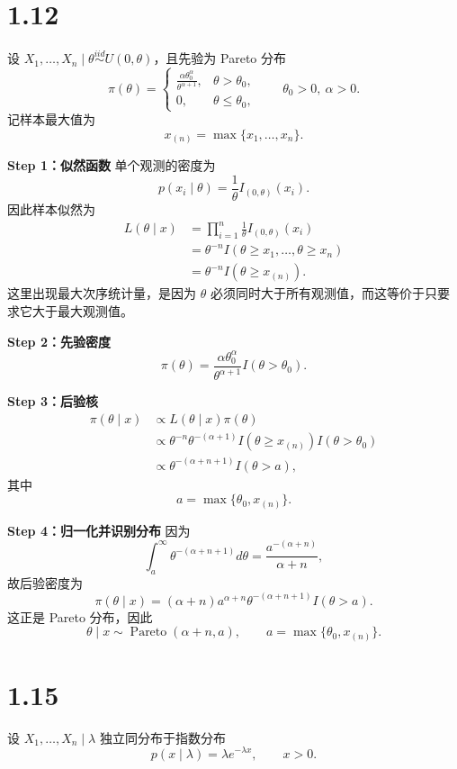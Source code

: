 \documentclass[UTF8,zihao=-4]{ctexart}
\begin{document}
\section*{1.12}
设 \(X_1,\ldots,X_n\mid\theta\overset{iid}{\sim}U(0,\theta)\)，且先验为 Pareto 分布
\[
\pi(\theta)=
\begin{cases}
\displaystyle\frac{\alpha\theta_0^\alpha}{\theta^{\alpha+1}},&\theta>\theta_0,\\
0,&\theta\leq\theta_0,
\end{cases}
\qquad\theta_0>0,\ \alpha>0.
\]
记样本最大值为
\[
x_{(n)}=\max\{x_1,\ldots,x_n\}.
\]

\textbf{Step 1：似然函数}
单个观测的密度为
\[
p(x_i\mid\theta)=\frac1\theta I_{(0,\theta)}(x_i).
\]
因此样本似然为
\[
\begin{aligned}
L(\theta\mid x)&=\prod_{i=1}^n\frac1\theta I_{(0,\theta)}(x_i)\\
&=\theta^{-n}I(\theta\geq x_1,\ldots,\theta\geq x_n)\\
&=\theta^{-n}I(\theta\geq x_{(n)}).
\end{aligned}
\]
这里出现最大次序统计量，是因为 \(\theta\) 必须同时大于所有观测值，而这等价于只要求它大于最大观测值。

\textbf{Step 2：先验密度}
\[
\pi(\theta)=\frac{\alpha\theta_0^\alpha}{\theta^{\alpha+1}}
I(\theta>\theta_0).
\]

\textbf{Step 3：后验核}
\[
\begin{aligned}
\pi(\theta\mid x)&\propto L(\theta\mid x)\pi(\theta)\\
&\propto\theta^{-n}\theta^{-(\alpha+1)}
I(\theta\geq x_{(n)})I(\theta>\theta_0)\\
&\propto\theta^{-(\alpha+n+1)}I(\theta>a),
\end{aligned}
\]
其中
\[
a=\max\{\theta_0,x_{(n)}\}.
\]

\textbf{Step 4：归一化并识别分布}
因为
\[
\int_a^\infty\theta^{-(\alpha+n+1)}d\theta
=\frac{a^{-(\alpha+n)}}{\alpha+n},
\]
故后验密度为
\[
\boxed{\pi(\theta\mid x)=
(\alpha+n)a^{\alpha+n}\theta^{-(\alpha+n+1)}I(\theta>a).}
\]
这正是 Pareto 分布，因此
\[
\boxed{\theta\mid x\sim\operatorname{Pareto}(\alpha+n,a),
\qquad a=\max\{\theta_0,x_{(n)}\}.}
\]

\section*{1.15}
设 \(X_1,\ldots,X_n\mid\lambda\) 独立同分布于指数分布
\[
p(x\mid\lambda)=\lambda e^{-\lambda x},\qquad x>0.
\]
\end{document}
